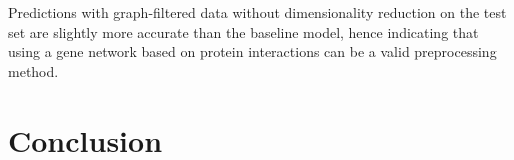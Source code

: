 \documentclass[10pt,conference,compsocconf]{IEEEtran}
\begin{document}
\par  
Predictions with graph-filtered data without dimensionality reduction on the test set are slightly more accurate than the baseline model, hence indicating that using a gene network based on protein interactions can be a valid preprocessing method.

\section*{Conclusion}



\end{document}
